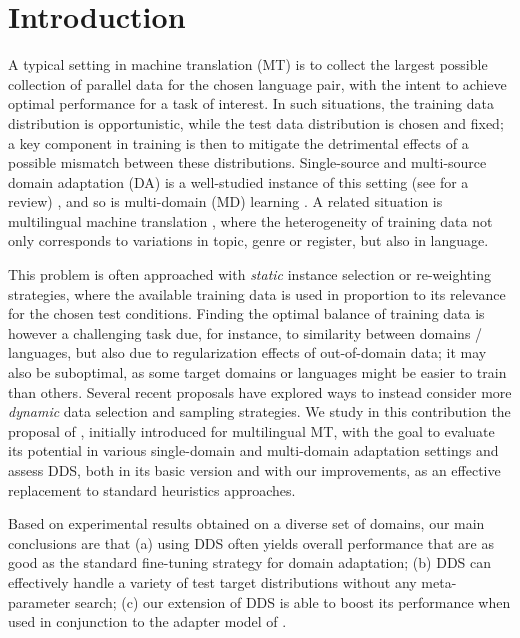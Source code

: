 \documentclass[11pt,a4paper]{article}
\newcommand{\fyTodo}[1]{\Todo[FY:]{\textcolor{orange}{#1}}}
\begin{document}
\section{Introduction}\label{sec:intro}
A typical setting in machine translation (MT) is to collect the largest possible collection of parallel data for the chosen language pair, with the intent to achieve optimal performance for a task of interest. In such situations, the training data distribution is opportunistic, while the test data distribution is chosen and fixed; a key component in training is then to mitigate the detrimental effects of a possible mismatch between these distributions. Single-source and multi-source domain adaptation (DA) is a well-studied instance of this setting (see \citep{Chu2017comparison} for a review) , and so is multi-domain (MD) learning \cite{Chu18multilingual,Zeng18multidomain,Jiang19multidomain,Pham21revisiting}. A related situation is multilingual machine translation \cite{Firat16multiway,Ha16towards,Johnson17google,Arivazhagan19massively}\fyTodo{Add more recent work}, where the heterogeneity of training data not only corresponds to variations in topic, genre or register, but also in language.

\fyTodo{Label or covariate shift ?}
This problem is often approached with \emph{static} instance selection or re-weighting strategies, where the available training data is used in proportion to its relevance for the chosen test conditions. Finding the optimal balance of training data is however a challenging task due, for instance, to similarity between domains / languages, but also due to regularization effects of out-of-domain data; it may also be suboptimal, as some target domains or languages might be easier to train than others. Several recent proposals \cite{Wang17instance,Zhang19curriculum,Kumar19reinforcement,Wang20learning-multi} have explored ways to instead consider more \emph{dynamic} data selection and sampling strategies. We study in this contribution the proposal of \citet{Wang20balancing}, initially introduced for multilingual MT, with the goal to evaluate its potential in various single-domain and multi-domain adaptation settings and assess DDS, both in its basic version and with our improvements, as an effective replacement to standard heuristics approaches.

Based on experimental results obtained on a diverse set of domains, our main conclusions are that (a) using DDS often yields overall performance that are as good as the standard fine-tuning strategy for domain adaptation; (b) DDS can effectively handle a variety of test target distributions without any meta-parameter search; (c) our extension of DDS is able to boost its performance when used in conjunction to the adapter model of \citet{Bapna19simple}.
\end{document}
